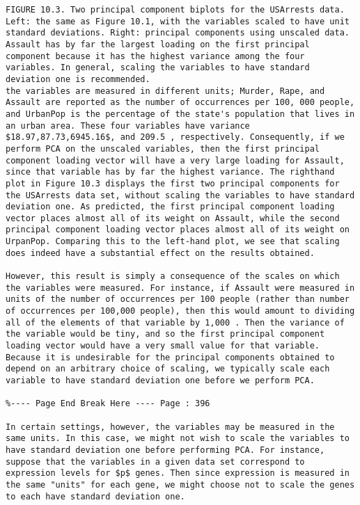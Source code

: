 \documentclass[10pt]{article}
\begin{document}
\begin{verbatim}
FIGURE 10.3. Two principal component biplots for the USArrests data. Left: the same as Figure 10.1, with the variables scaled to have unit standard deviations. Right: principal components using unscaled data. Assault has by far the largest loading on the first principal component because it has the highest variance among the four variables. In general, scaling the variables to have standard deviation one is recommended.
the variables are measured in different units; Murder, Rape, and Assault are reported as the number of occurrences per 100, 000 people, and UrbanPop is the percentage of the state's population that lives in an urban area. These four variables have variance $18.97,87.73,6945.16$, and 209.5 , respectively. Consequently, if we perform PCA on the unscaled variables, then the first principal component loading vector will have a very large loading for Assault, since that variable has by far the highest variance. The righthand plot in Figure 10.3 displays the first two principal components for the USArrests data set, without scaling the variables to have standard deviation one. As predicted, the first principal component loading vector places almost all of its weight on Assault, while the second principal component loading vector places almost all of its weight on UrpanPop. Comparing this to the left-hand plot, we see that scaling does indeed have a substantial effect on the results obtained.

However, this result is simply a consequence of the scales on which the variables were measured. For instance, if Assault were measured in units of the number of occurrences per 100 people (rather than number of occurrences per 100,000 people), then this would amount to dividing all of the elements of that variable by 1,000 . Then the variance of the variable would be tiny, and so the first principal component loading vector would have a very small value for that variable. Because it is undesirable for the principal components obtained to depend on an arbitrary choice of scaling, we typically scale each variable to have standard deviation one before we perform PCA.

%---- Page End Break Here ---- Page : 396

In certain settings, however, the variables may be measured in the same units. In this case, we might not wish to scale the variables to have standard deviation one before performing PCA. For instance, suppose that the variables in a given data set correspond to expression levels for $p$ genes. Then since expression is measured in the same "units" for each gene, we might choose not to scale the genes to each have standard deviation one.


\end{verbatim}
\end{document}

